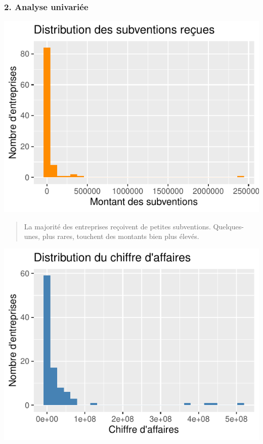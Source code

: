 \documentclass[mstat,12pt]{unswthesis}
\begin{document}
\normalsize

\newpage

\subsubsection{2. Analyse univariée}\label{analyse-univariuxe9e}

\medskip

\includegraphics{scdon2-UPV-report-template_sansPython_files/figure-latex/unnamed-chunk-21-1.pdf}

\begin{quote}
La majorité des entreprises reçoivent de petites subventions.
Quelques-unes, plus rares, touchent des montants bien plus élevés.
\end{quote}

\medskip

\includegraphics{scdon2-UPV-report-template_sansPython_files/figure-latex/unnamed-chunk-22-1.pdf}
\end{document}
